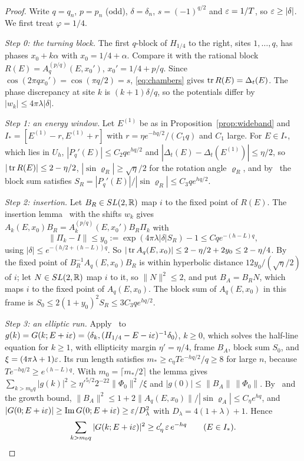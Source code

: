 \begin{proof}
Write $q=q_n$, $p=p_n$ (odd), $\delta=\delta_n$, $s=(-1)^{q/2}$ and $\varepsilon=1/T$, so $\varepsilon\ge|\delta|$. We first treat $\varphi=1/4$.

\emph{Step 0: the turning block.} The first $q$-block of $H_{1/4}$ to the right, sites $1,\dots,q$, has phases $x_0+k\alpha$ with $x_0=1/4+\alpha$. Compare it with the rational block $R(E)=A^{(p/q)}_q(E,x_0')$, $x_0'=1/4+p/q$. Since $\cos(2\pi qx_0')=\cos(\pi q/2)=s$, \eqref{eq:chambers} gives $\operatorname{tr} R(E)=\Delta_t(E)$. The phase discrepancy at site $k$ is $(k+1)\delta/q$, so the potentials differ by $|w_k|\le4\pi\lambda|\delta|$.

\emph{Step 1: an energy window.} Let $E^{(1)}$ be as in Proposition~\ref{prop:wideband} and $I_*=[E^{(1)}-r,E^{(1)}+r]$ with $r=\eta e^{-hq/2}/(C_1q)$ and $C_1$ large. For $E\in I_*$, which lies in $U_h$, $|P_q'(E)|\le C_2qe^{hq/2}$ and $|\Delta_t(E)-\Delta_t(E^{(1)})|\le\eta/2$, so $|\operatorname{tr} R(E)|\le2-\eta/2$, $|\sin\varrho_R|\ge\sqrt\eta/2$ for the rotation angle $\varrho_R$, and by~\cite[Lemma~8.2(1)]{DMamo} the block sum satisfies $S_R=|P_q'(E)|/|\sin\varrho_R|\le C_3qe^{hq/2}$.

\emph{Step 2: insertion.} Let $B_R\in SL(2,\mathbb R)$ map $i$ to the fixed point of $R(E)$. The insertion lemma~\cite[Lemma~9.3]{DMamo} with the shifts $w_k$ gives $A_k(E,x_0)B_R=A^{(p/q)}_k(E,x_0')B_R\Pi_k$ with
\[
\|\Pi_k-I\|\le y_0:=\exp(4\pi\lambda|\delta|S_R)-1\le C q e^{-(h-L)q},
\]
using $|\delta|\le e^{-(h/2+(h-L))q}$. So $|\operatorname{tr} A_q(E,x_0)|\le2-\eta/2+2y_0\le2-\eta/4$. By~\cite[Lemma~9.4]{DMamo} the fixed point of $B_R^{-1}A_q(E,x_0)B_R$ is within hyperbolic distance $12y_0/(\sqrt\eta/2)$ of $i$; let $N\in SL(2,\mathbb R)$ map $i$ to it, so $\|N\|^2\le2$, and put $B_A=B_RN$, which maps $i$ to the fixed point of $A_q(E,x_0)$. The block sum of $A_q(E,x_0)$ in this frame is $S_0\le2(1+y_0)^2S_R\le3C_3qe^{hq/2}$.

\emph{Step 3: an elliptic run.} Apply~\cite[Lemma~9.6]{DMamo} to $g(k)=G(k;E+i\varepsilon)=\langle\delta_k,(H_{1/4}-E-i\varepsilon)^{-1}\delta_0\rangle$, $k\ge0$, which solves the half-line equation for $k\ge1$, with ellipticity margin $\eta'=\eta/4$, frame $B_A$, block sum $S_0$, and $\xi=(4\pi\lambda+1)\varepsilon$. Its run length satisfies $m_*\ge c_\eta Te^{-hq/2}/q\ge8$ for large $n$, because $Te^{-hq/2}\ge e^{(h-L)q}$. With $m_0=\lceil m_*/2\rceil$ the lemma gives $\sum_{k>m_0q}|g(k)|^2\ge\eta'^{5/2}2^{-22}\|\Phi_0\|^2/\xi$ and $|g(0)|\le\|B_A\|\,\|\Phi_0\|$. By~\cite[Lemma~8.2(4)]{DMamo} and the growth bound, $\|B_A\|^2\le1+2\|A_q(E,x_0)\|/|\sin\varrho_A|\le C_\eta e^{hq}$, and $|G(0;E+i\varepsilon)|\ge\operatorname{Im}G(0;E+i\varepsilon)\ge\varepsilon/D_\lambda^2$ with $D_\lambda=4(1+\lambda)+1$. Hence
\[
\sum_{k>m_0q}|G(k;E+i\varepsilon)|^2\ge c'_\eta\,\varepsilon\,e^{-hq}\qquad(E\in I_*).
\]


\end{proof}
